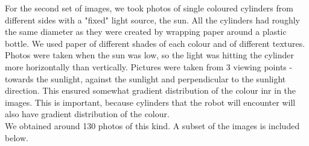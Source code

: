 \documentclass[12pt,a4paper]{article}
\begin{document}
	For the second set of images, we took photos of single coloured cylinders from different sides with a "fixed" light source, the sun. All the cylinders had roughly the same diameter as they were created by wrapping paper around a plastic bottle. We used paper of different shades of each colour and of different textures. \\
	
	Photos were taken when the sun was low, so the light was hitting the cylinder more horizontally than vertically. Pictures were taken from 3 viewing points - towards the sunlight, against the sunlight and perpendicular to the sunlight direction. This ensured somewhat gradient distribution of the colour inr in the images. This is important, because cylinders that the robot will encounter will also have gradient distribution of the colour.\\
	
	We obtained around 130 photos of this kind. A subset of the images is included below.
	
\end{document}
